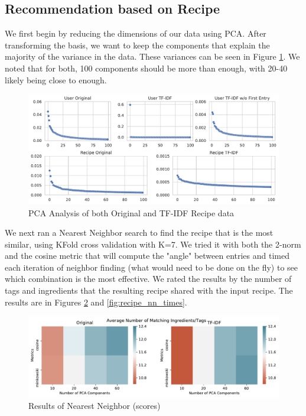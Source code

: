 \documentclass[11pt]{article}
\begin{document}
\subsection{Recommendation based on Recipe}
We first begin by reducing the dimensions of our data using PCA. After transforming the basis, we want to keep the components that explain the majority of the variance in the data. These variances can be seen in Figure \ref{fig:pca}. We noted that for both, 100 components should be more than enough, with 20-40 likely being close to enough.
\begin{figure}[t]
\centering
\includegraphics[width=1\textwidth]{figs/pca.pdf}
\caption{PCA Analysis of both Original and TF-IDF Recipe data}
\label{fig:pca}
\end{figure}

We next ran a Nearest Neighbor search to find the recipe that is the most similar, using KFold cross validation with K=7. We tried it with both the 2-norm and the cosine metric that will compute the "angle" between entries and timed each iteration of neighbor finding (what would need to be done on the fly) to see which combination is the most effective. We rated the results by the number of tags and ingredients that the resulting recipe shared with the input recipe. The results are in Figures \ref{fig:recipe_nn_scores} and \ref{fig:recipe_nn_times}.

\begin{figure}[t]
\centering
\includegraphics[width=1\textwidth]{figs/recipeNN_scores.pdf}
\caption{Results of Nearest Neighbor (scores)}
\label{fig:recipe_nn_scores}
\end{figure}
\end{document}
